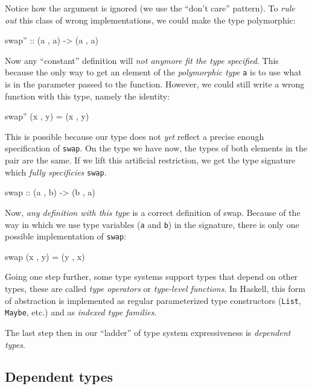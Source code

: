             Notice how the argument is ignored (we use the ``don't care'' pattern).
            To \emph{rule out} this class of wrong implementations, we could make the type polymorphic:
            \begin{haskellcode}
        swap'' :: (a , a) -> (a , a)
            \end{haskellcode}

            Now any ``constant'' definition will \emph{not anymore fit the type specified}.
            This because the only way to get an element of the \emph{polymorphic type} \texttt{a}
            is to use what is in the parameter passed to the function.
            However, we could still write a wrong function with this type, namely the identity:
            \begin{haskellcode}
        swap'' (x , y) = (x , y)
            \end{haskellcode}

            This is possible because our type does not \emph{yet} reflect a precise enough specification of \texttt{swap}.
            On the type we have now, the types of both elements in the pair are the same.
            If we lift this artificial restriction, we get the type signature which \emph{fully specificies} \texttt{swap}.
            \begin{haskellcode}
        swap :: (a , b) -> (b , a)
            \end{haskellcode}

            Now, \emph{any definition with this type} is a correct definition of swap.
            Because of the way in which we use type variables (\texttt{a} and \texttt{b}) in the signature,
            there is only one possible implementation of \texttt{swap}:
            \begin{haskellcode}
        swap (x , y) = (y , x)
            \end{haskellcode}

            Going one step further, some type systems support types that depend on other types, these are
            called \emph{type operators} or \emph{type-level functions}.
            In Haskell, this form of abstraction is implemented as regular parameterized type constructors
            (\texttt{List}, \texttt{Maybe}, etc.) and as \emph{indexed type families}.

            The last step then in our ``ladder'' of type system expressiveness is \emph{dependent types}.

        \subsection{Dependent types}
        \label{subsec:dependent-types}

